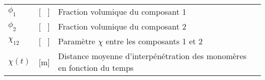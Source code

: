 \begin{longtable}{l p{2.5cm} p{4in}}
	$\phi_1$          & [ \ ]                                               & Fraction volumique du composant 1                                                     \\
	$\phi_2$          & [ \ ]                                               & Fraction volumique du composant 2                                                     \\
	$\chi_{12}$       & [ \ ]                                               & Paramètre $\chi$ entre les composants 1 et 2                                          \\
	$\chi(t)$         & [\si{\metre}]                                       & Distance moyenne d'interpénétration des monomères en fonction du temps
\end{longtable}
